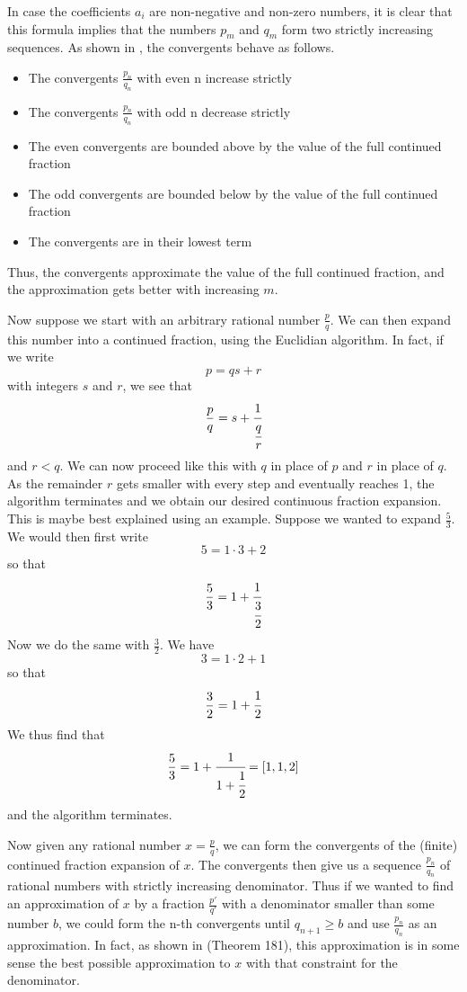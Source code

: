 \documentclass[a4paper, draft]{article}
\theoremstyle{own}
\theoremstyle{remark}
\begin{document}
In case the coefficients $a_i$ are non-negative and non-zero numbers, it is clear that this formula implies that the numbers $p_m$ and $q_m$ form two strictly increasing sequences. As shown in \cite{HW}, the convergents behave as follows.
\begin{itemize}
	\item The convergents $\frac{p_n}{q_n}$ with even n increase strictly
	\item The convergents $\frac{p_n}{q_n}$ with odd n decrease strictly
	\item The even convergents are bounded above by the value of the full continued fraction
	\item The odd convergents are bounded below by the value of the full continued fraction
	\item The convergents are in their lowest term
\end{itemize}


Thus, the convergents approximate the value of the full continued fraction, and the approximation gets better with increasing $m$. 

Now suppose we start with an arbitrary rational number $\frac{p}{q}$. We can then expand this number into a continued fraction, using the Euclidian algorithm. In fact, if we write
$$
p = qs + r
$$
with integers $s$ and $r$, we see that 
$$
\frac{p}{q} = s + \cfrac{1}{\cfrac{q}{r}}
$$
and $r < q$. We can now proceed like this with $q$ in place of $p$ and $r$ in place of $q$. As the remainder $r$ gets smaller with every step and eventually reaches 1, the algorithm terminates and we obtain our desired continuous fraction expansion. This is maybe best explained using an example. Suppose we wanted to expand $\frac{5}{3}$. We would then first write
$$
5 = 1 \cdot 3 + 2
$$
so that
$$
\frac{5}{3} = 1 + \cfrac{1}{\cfrac{3}{2}}
$$
Now we do the same with $\frac{3}{2}$. We have
$$
3 = 1 \cdot 2 + 1
$$
so that
$$
\frac{3}{2} = 1 + \cfrac{1}{2}
$$
We thus find that
$$
\frac{5}{3} = 1 + \cfrac{1}{1 + \cfrac{1}{2}} = [1, 1, 2]
$$
and the algorithm terminates.

Now given any rational number $x = \frac{p}{q}$, we can form the convergents of the (finite) continued fraction expansion of $x$. The convergents then give us a sequence $\frac{p_n}{q_n}$ of rational numbers with strictly increasing denominator. Thus if we wanted to find an approximation of $x$ by a fraction $\frac{p'}{q'}$ with a denominator smaller than some number $b$, we could form the n-th convergents until $q_{n+1} \geq b$ and use $\frac{p_n}{q_n}$ as an approximation. In fact, as shown in \cite{HW} (Theorem 181), this approximation is in some sense the best possible approximation to $x$ with that constraint for the denominator. 
\end{document}
